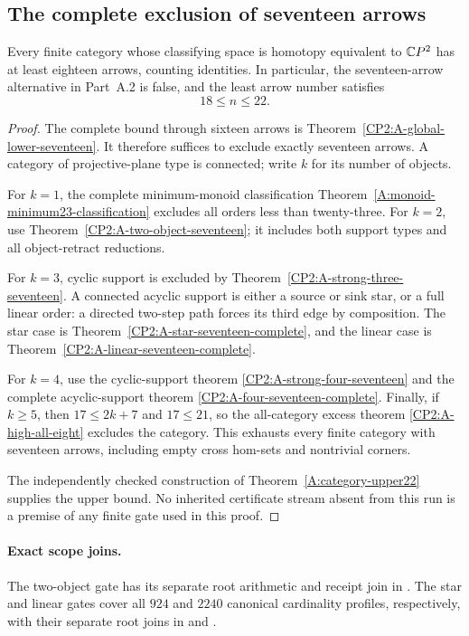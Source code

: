 \subsection{The complete exclusion of seventeen arrows}

\begin{theorem}
\label{CP2:A-global-lower-eighteen}
Every finite category whose classifying space is homotopy
equivalent to $\mathbb{C}P^2$ has at least eighteen arrows, counting
identities. In particular, the seventeen-arrow alternative
in Part~A.2 is false, and the least arrow number satisfies
\[
\boxed{18\leq n\leq22}.
\]
\end{theorem}
\begin{proof}
The complete bound through sixteen arrows is
Theorem~\ref{CP2:A-global-lower-seventeen}. It therefore
suffices to exclude exactly seventeen arrows. A category
of projective-plane type is connected; write $k$ for its
number of objects.

For $k=1$, the complete minimum-monoid classification
Theorem~\ref{A:monoid-minimum23-classification} excludes
all orders less than twenty-three. For $k=2$, use
Theorem~\ref{CP2:A-two-object-seventeen}; it includes
both support types and all object-retract reductions.

For $k=3$, cyclic support is excluded by
Theorem~\ref{CP2:A-strong-three-seventeen}. A connected
acyclic support is either a source or sink star, or a
full linear order: a directed two-step path forces its
third edge by composition. The star case is
Theorem~\ref{CP2:A-star-seventeen-complete}, and the
linear case is Theorem~\ref{CP2:A-linear-seventeen-complete}.

For $k=4$, use the cyclic-support theorem
\ref{CP2:A-strong-four-seventeen} and the complete
acyclic-support theorem \ref{CP2:A-four-seventeen-complete}.
Finally, if $k\geq5$, then $17\leq2k+7$ and $17\leq21$,
so the all-category excess theorem
\ref{CP2:A-high-all-eight} excludes the category. This
exhausts every finite category with seventeen arrows,
including empty cross hom-sets and nontrivial corners.

The independently checked construction of
Theorem~\ref{A:category-upper22} supplies the upper bound.
No inherited certificate stream absent from this run is
a premise of any finite gate used in this proof.
\end{proof}

\paragraph{Exact scope joins.}
The two-object gate has its separate root arithmetic and
receipt join in .
The star and linear gates cover all $924$ and $2240$
canonical cardinality profiles, respectively, with their
separate root joins in
 and
.

